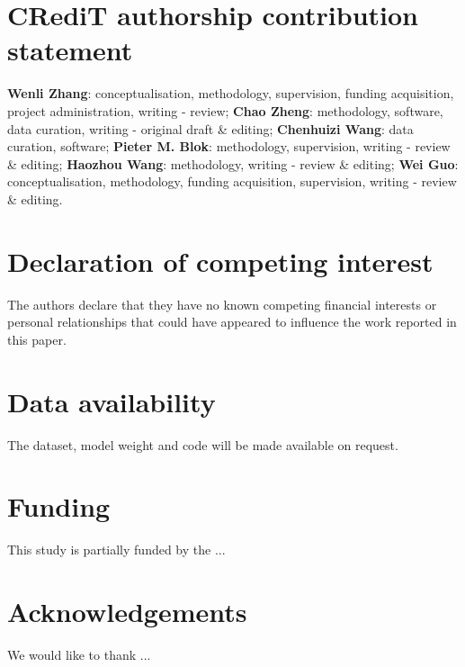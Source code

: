 \documentclass[12pt]{article}
\begin{document}
\section*{CRediT authorship contribution statement}
\textbf{Wenli Zhang}: conceptualisation, methodology, supervision, funding acquisition, project administration, writing - review; \textbf{Chao Zheng}: methodology, software, data curation, writing - original draft \& editing; \textbf{Chenhuizi Wang}: data curation, software; \textbf{Pieter M. Blok}: methodology, supervision, writing - review \& editing; \textbf{Haozhou Wang}: methodology, writing - review \& editing; \textbf{Wei Guo}: conceptualisation, methodology, funding acquisition, supervision, writing - review \& editing.

\section*{Declaration of competing interest}
The authors declare that they have no known competing financial interests or personal relationships that could have appeared to influence the work reported in this paper.

\section*{Data availability}
The dataset, model weight and code will be made available on request.

\section*{Funding}
This study is partially funded by the ...

\section*{Acknowledgements}
We would like to thank ... \citep{blok_highthroughput_2025}

{\clearpage}



\end{document}
